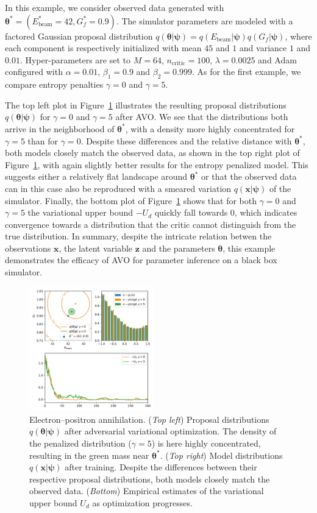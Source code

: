 \documentclass[twocolumn,superscriptaddress,aps]{revtex4-1}
\newcommand{\qxpsi}{q(\mathbf{x}|\bfpsi)}
\newcommand{\bftheta}{{\bm \theta}}
\newcommand{\bfpsi}{{\bm \psi}}
\newcommand{\bfz}{\mathbf{z}}
\theoremstyle{plain}
\begin{document}
In this example, we consider observed data generated with $\bftheta^* =
(E_\text{beam}^*=42, G_f^*=0.9)$. The simulator parameters are modeled with a
factored Gaussian proposal distribution $q(\bftheta|\bfpsi) = q(E_\text{beam}|\bfpsi)
q(G_f|\bfpsi)$, where each component is respectively initialized with mean $45$
and $1$ and variance $1$ and $0.01$. Hyper-parameters are set to $M=64$,
$n_\text{critic}=100$, $\lambda=0.0025$ and Adam configured with $\alpha=0.01$,
$\beta_1=0.9$ and $\beta_2=0.999$. As for the first example, we compare
entropy penalties $\gamma=0$ and $\gamma=5$.

The top left plot in Figure~\ref{fig:weinberg} illustrates the resulting
proposal distributions $q(\bftheta|\bfpsi)$ for $\gamma=0$ and $\gamma=5$ after
AVO. We see that the distributions both arrive
in the neighborhood of $\bftheta^*$, with a density  more highly concentrated for
$\gamma=5$ than for $\gamma=0$.  Despite these differences and the relative
distance with $\bftheta^*$, both models closely match the observed data, as shown
in the top right plot of  Figure~\ref{fig:weinberg}, with again slightly better
results for the entropy penalized model. This suggests either a relatively flat
landscape around $\bftheta^*$ or that the observed data can in this case also be
reproduced with a smeared variation $\qxpsi$ of the simulator.
Finally, the bottom plot of Figure~\ref{fig:weinberg} shows that for both
$\gamma=0$ and $\gamma=5$ the variational upper bound $-U_d$ quickly fall
towards $0$, which indicates  convergence towards a distribution that the critic
cannot distinguish from the true distribution. In summary, despite the intricate
relation betwen the observations $\mathbf{x}$, the latent variable $\bfz$
and the parameters $\bftheta$, this example demonstrates the efficacy
of AVO for parameter inference on a black box
simulator.

\begin{figure}
    \centering
    \includegraphics[width=0.48\textwidth]{figures/weinberg.pdf}
    \caption{Electron--positron annihilation.
    ({\it Top left}) Proposal distributions $q(\bftheta|\bfpsi)$ after adversarial variational optimization. The density of the penalized distribution ($\gamma=5$) is here highly concentrated, resulting in the green mass near $\bftheta^*$.
    ({\it Top right}) Model distributions $\qxpsi$ after training. Despite the differences between their respective proposal distributions, both models closely match the observed data.
    ({\it Bottom}) Empirical estimates of the variational upper bound $U_d$ as optimization progresses.
             }\label{fig:weinberg}
\end{figure}
\end{document}
